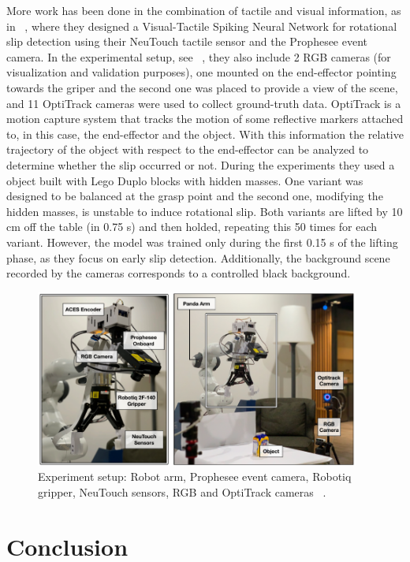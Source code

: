 More work has been done in the combination of tactile and visual information, as in ~\cite{rss2020}, where they designed a Visual-Tactile Spiking Neural Network for rotational slip detection using their NeuTouch tactile sensor and the Prophesee event camera. In the experimental setup, see ~, they also include 2 RGB cameras (for visualization and validation purposes), one mounted on the end-effector pointing towards the griper and the second one was placed to provide a view of the scene, and 11 OptiTrack cameras were used to collect ground-truth data. OptiTrack is a motion capture system that tracks the motion of some reflective markers attached to, in this case, the end-effector and the object. With this information the relative trajectory of the object with respect to the end-effector can be analyzed to determine whether the slip occurred or not. During the experiments they used a object built with Lego Duplo blocks with hidden masses. One variant was designed to be balanced at the grasp point and the second one, modifying the hidden masses, is unstable to induce rotational slip. Both variants are lifted by 10 cm off the table (in 0.75 s) and then holded, repeating this 50 times for each variant. However, the model was trained only during the first 0.15 s of the lifting phase, as they focus on early slip detection. Additionally, the background scene recorded by the cameras corresponds to a controlled black background.

\begin{figure}[h]
    \centering
    \includegraphics[width=0.95\textwidth]{resources/images/rss2020}
    \caption{Experiment setup: Robot arm, Prophesee event camera, Robotiq gripper, NeuTouch sensors, RGB and OptiTrack cameras ~\cite{rss2020}.}\label{fig:rss2020}
\end{figure}

\section{Conclusion}

